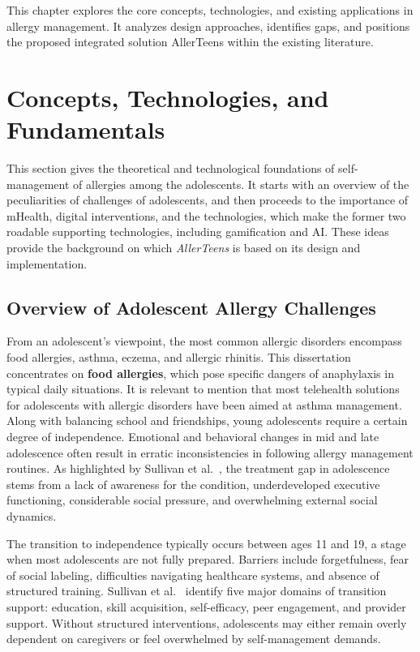 \documentclass[MScCS]{uccthesis}
\begin{document}
This chapter explores the core concepts, technologies, and existing applications in allergy management. It analyzes design approaches, identifies gaps, and positions the proposed integrated solution AllerTeens within the existing literature.

\section{Concepts, Technologies, and Fundamentals}

This section gives the theoretical and technological foundations of self-management of allergies among the adolescents. It starts with an overview of the peculiarities of challenges of adolescents, and then proceeds to the importance of mHealth, digital interventions, and the technologies, which make the former two roadable supporting technologies, including gamification and AI. These ideas provide the background on which \textit{AllerTeens} is based on its design and implementation.

\subsection{Overview of Adolescent Allergy Challenges}
From an adolescent's viewpoint, the most common allergic disorders encompass food allergies, asthma, eczema, and allergic rhinitis. This dissertation concentrates on \textbf{food allergies}, which pose specific dangers of anaphylaxis in typical daily situations. It is relevant to mention that most telehealth solutions for adolescents with allergic disorders have been aimed at asthma management. Along with balancing school and friendships, young adolescents require a certain degree of independence. Emotional and behavioral changes in mid and late adolescence often result in erratic inconsistencies in following allergy management routines. As highlighted by Sullivan et al.~\cite{sullivan2024telehealth}, the treatment gap in adolescence stems from a lack of awareness for the condition, underdeveloped executive functioning, considerable social pressure, and overwhelming external social dynamics.



The transition to independence typically occurs between ages 11 and 19, a stage when most adolescents are not fully prepared. Barriers include forgetfulness, fear of social labeling, difficulties navigating healthcare systems, and absence of structured training. Sullivan et al.~\cite{sullivan2024telehealth} identify five major domains of transition support: education, skill acquisition, self-efficacy, peer engagement, and provider support. Without structured interventions, adolescents may either remain overly dependent on caregivers or feel overwhelmed by self-management demands.
\end{document}

